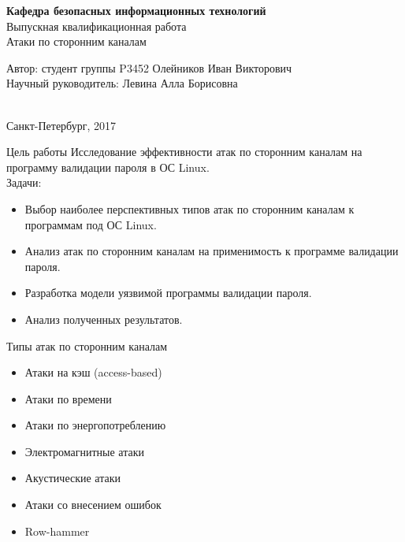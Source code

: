 \documentclass[14pt]{beamer}
\title[Атаки по сторонним каналам]{}
\author[]{Олейников Иван}
\institute[]{Университет ИТМО}
\date[]{Санкт-Петербург, 2017}
\begin{document}
\begin{frame}

\centering

\textbf{\large Кафедра безопасных информационных технологий} \\[0.5cm]
Выпускная квалификационная работа \\[1cm]
Атаки по сторонним каналам \\[1cm]
{
  \small
  
  Автор: студент группы P3452 Олейников Иван Викторович \\
  Научный руководитель: Левина Алла Борисовна
} \\[1cm]
{\footnotesize Санкт-Петербург, 2017}

\end{frame}

\begin{frame}{Цель работы}
    Исследование эффективности атак по сторонним каналам на программу валидации
    пароля в ОС Linux. \\[3mm]
    Задачи:
    \begin{itemize}
        \item Выбор наиболее перспективных типов атак по сторонним каналам к
              программам под ОС Linux.
        \item Анализ атак по сторонним каналам на применимость к программе валидации
              пароля.
        \item Разработка модели уязвимой программы валидации пароля.
        \item Анализ полученных результатов.
    \end{itemize}
\end{frame}

\begin{frame}[nologo]{Типы атак по сторонним каналам}
    \begin{itemize}
        \item Атаки на кэш (access-based)
        \item Атаки по времени
        \item Атаки по энергопотреблению
        \item Электромагнитные атаки
        \item Акустические атаки
        \item Атаки со внесением ошибок
        \item Row-hammer
    \end{itemize}
\end{frame}
\end{document}
